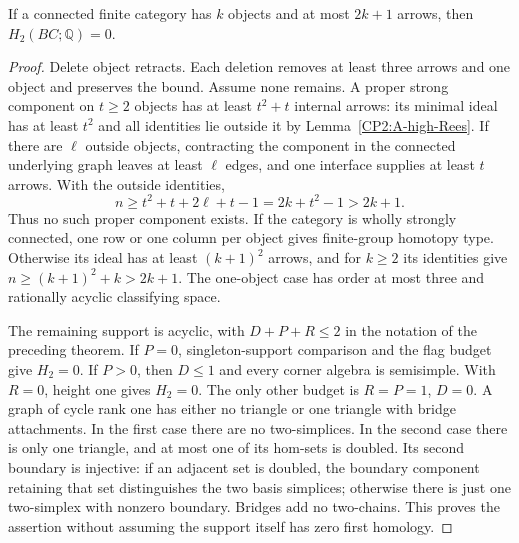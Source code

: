 \begin{lemma}
\label{CP2:A-high-H2-cost}
If a connected finite category has $k$ objects and at most
$2k+1$ arrows, then $H_2(BC;\mathbb Q)=0$.
\end{lemma}
\begin{proof}
Delete object retracts.  Each deletion removes at least
three arrows and one object and preserves the bound.
Assume none remains.  A proper strong component on
$t\geq2$ objects has at least $t^2+t$ internal arrows:
its minimal ideal has at least $t^2$ and all identities
lie outside it by Lemma~\ref{CP2:A-high-Rees}.
If there are $\ell$ outside objects, contracting the
component in the connected underlying graph leaves at
least $\ell$ edges, and one interface supplies at least
$t$ arrows.  With the outside identities,
\[
 n\geq t^2+t+2\ell+t-1=2k+t^2-1>2k+1.
\]
Thus no such proper component exists.  If the category
is wholly strongly connected, one row or one column
per object gives finite-group homotopy type.  Otherwise
its ideal has at least $(k+1)^2$ arrows, and for
$k\geq2$ its identities give
$n\geq(k+1)^2+k>2k+1$.  The one-object case has order
at most three and rationally acyclic classifying space.

The remaining support is acyclic, with $D+P+R\leq2$
in the notation of the preceding theorem.  If $P=0$,
singleton-support comparison and the flag budget give
$H_2=0$.  If $P>0$, then $D\leq1$ and every corner
algebra is semisimple.  With $R=0$, height one gives
$H_2=0$.  The only other budget is $R=P=1$, $D=0$.
A graph of cycle rank one has either no triangle or
one triangle with bridge attachments.  In the first
case there are no two-simplices.  In the second case
there is only one triangle, and at most one of its
hom-sets is doubled.  Its second boundary is injective:
if an adjacent set is doubled, the boundary component
retaining that set distinguishes the two basis
simplices; otherwise there is just one two-simplex
with nonzero boundary.  Bridges add no two-chains.
This proves the assertion without assuming the
support itself has zero first homology.
\end{proof}

